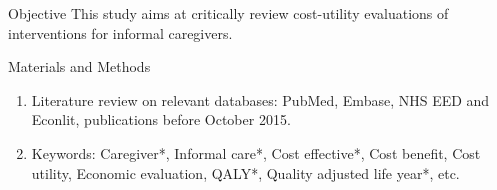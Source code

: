 \documentclass[final]{beamer}
\newlength{\sepwid}
\newlength{\onecolwid}
\newlength{\twocolwid}
\begin{document}
\begin{frame}[t]
\begin{columns}[t]
\begin{column}{\onecolwid}
\vspace{-1.0cm}
\begin{alertblock}{Objective}
This study aims at critically review cost-utility evaluations of interventions for informal caregivers.
\end{alertblock}








\vspace{-1.0cm}
\begin{block}{Materials and Methods}
\vspace{-1.0cm}
\begin{enumerate}
\item  \justifying Literature review on relevant databases: PubMed, Embase, NHS EED and Econlit,  publications before October 2015.
\item  Keywords: Caregiver*, Informal care*, Cost effective*, Cost benefit, Cost utility, Economic evaluation, QALY*, Quality adjusted life year*, etc.


\end{enumerate}
\end{block}
\end{column}
\end{columns}
\end{frame}
\end{document}
